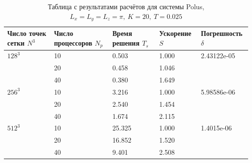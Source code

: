 \documentclass[oneside, final, 12pt]{extarticle}
\begin{document}
\begin{table}[H]
    \centering
    \begin{tabular}{|l|l|l|l|l|}
        \hline
        \makecell{Число точек \\сетки $ N^3 $} & \makecell{Число \\процессоров $ N_p $} & \makecell{Время \\решения $ T_s $} & Ускорение $ S $ & Погрешность $ \delta $ \\
        \hline
        $ 128^3 $                 & 10               & 0.503 & 1.000  & 2.43122e-05 \\
        \cline{2-4}
                              & 20               & 0.458 & 1.046  & \\
        \cline{2-4}
                              & 40              & 0.380 & 1.649 & \\
        \hline
        $ 256^3 $                 & 10               & 3.216 & 1.000  & 5.98586e-06 \\
        \cline{2-4}
                              & 20               & 2.540 & 1.454  & \\
        \cline{2-4}
                              & 40              & 1.674 & 2.115 & \\
        \hline
        $ 512^3 $                 & 10               & 25.325 & 1.000  & 1.4015e-06 \\
        \cline{2-4}
                              & 20               & 16.852 & 1.520 & \\
        \cline{2-4}
                              & 40              & 9.401 & 2.508 & \\
        \hline
    \end{tabular}
    \caption{Таблица с результатами расчётов для системы Polus, $ L_x = L_y = L_z = \pi, \: K = 20, \: T = 0.025 $}
\end{table}
\end{document}
